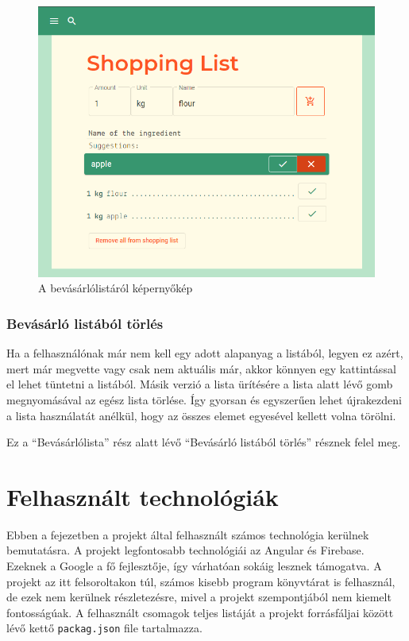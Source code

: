\documentclass[12pt]{report}
\theoremstyle{definition}
\begin{document}
\begin{figure}[H]%
    \centering
    \includegraphics[width=11.5cm]{pictures/web-shoppinglist.png}
	\caption{A bevásárlólistáról képernyőkép}%
    \label{fig:shoppinglist}%
\end{figure}


\subsection{Bevásárló listából törlés}
Ha a felhasználónak már nem kell egy adott alapanyag a listából, legyen ez azért, mert már megvette vagy csak nem aktuális már, akkor könnyen egy kattintással el lehet tüntetni a listából. Másik verzió a lista ürítésére a lista alatt lévő gomb megnyomásával az egész lista törlése. Így gyorsan és egyszerűen lehet újrakezdeni a lista használatát anélkül, hogy az összes elemet egyesével kellett volna törölni.

Ez  a “Bevásárlólista” rész alatt lévő “Bevásárló listából törlés” résznek felel meg. 


\chapter{Felhasznált technológiák}
Ebben a fejezetben a projekt által felhasznált számos technológia kerülnek bemutatásra. A projekt legfontosabb technológiái az Angular és Firebase. 
Ezeknek a Google a fő fejlesztője, így várhatóan sokáig lesznek támogatva.
A projekt az itt felsoroltakon túl, számos kisebb program könyvtárat is felhasznál, de ezek nem kerülnek részletezésre, mivel a projekt szempontjából nem kiemelt fontosságúak.
A felhasznált csomagok teljes listáját a projekt forrásfáljai között lévő kettő \texttt{packag.json} file tartalmazza.
\end{document}
